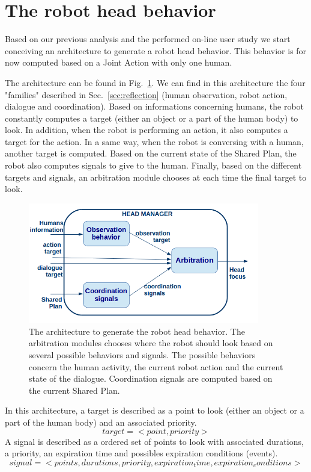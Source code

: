 \documentclass[english,a4paper,11pt,twoside]{StyleThese}
\begin{document}
\section{The robot head behavior}

Based on our previous analysis and the performed on-line user study we start conceiving an architecture to generate a robot head behavior. This behavior is for now computed based on a Joint Action with only one human.

The architecture can be found in Fig.~\ref{fig:headArchi}. We can find in this architecture the four "families" described in Sec.~\ref{sec:reflection} (human observation, robot action, dialogue and coordination). Based on informations concerning humans, the robot constantly computes a target (either an object or a part of the human body) to look. In addition, when the robot is performing an action, it also computes a target for the action. In a same way, when the robot is conversing with a human, another target is computed. Based on the current state of the Shared Plan, the robot also computes signals to give to the human. Finally, based on the different targets and signals, an arbitration module chooses at each time the final target to look.

\begin{figure}[!h]
	\centering
    \includegraphics[width=0.9\textwidth]{figs/Chapter6/Head_archi.png}
    \caption{The architecture to generate the robot head behavior. The arbitration modules chooses where the robot should look based on several possible behaviors and signals. The possible behaviors concern the human activity, the current robot action and the current state of the dialogue. Coordination signals are computed based on the current Shared Plan.}
    \label{fig:headArchi}
\end{figure}

In this architecture, a target is described as a point to look (either an object or a part of the human body) and an associated priority.
$$target = <point, priority>$$
A signal is described as a ordered set of points to look with associated durations, a priority, an expiration time and possibles expiration conditions (events).
$$signal = <points, durations, priority, expiration_time, expiration_conditions>$$
\end{document}
